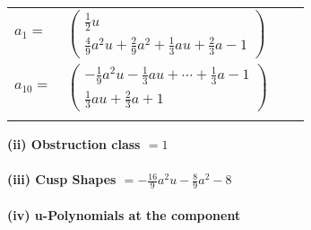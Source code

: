 \documentclass[1p]{elsarticle_modified}
\theoremstyle{definition}
\begin{document}
\begin{tabular}{m{7pt} m{180pt} m{7pt} m{180pt} }
\flushright $a_{1}=$&$\begin{pmatrix}\frac{1}{2} u\\\frac{4}{9} a^2 u+\frac{2}{9} a^2+\frac{1}{3} a u+\frac{2}{3} a-1\end{pmatrix}$ \\
\flushright $a_{10}=$&$\begin{pmatrix}-\frac{1}{9} a^2 u-\frac{1}{3} a u+\cdots+\frac{1}{3} a-1\\\frac{1}{3} a u+\frac{2}{3} a+1\end{pmatrix}$\\&\end{tabular}
\flushleft \textbf{(ii) Obstruction class $= 1$}\\~\\
\flushleft \textbf{(iii) Cusp Shapes $= -\frac{16}{9} a^2 u-\frac{8}{9} a^2-8$}\\~\\
\newpage\renewcommand{\arraystretch}{1}
\flushleft \textbf{(iv) u-Polynomials at the component}\newline \\
\end{document}

